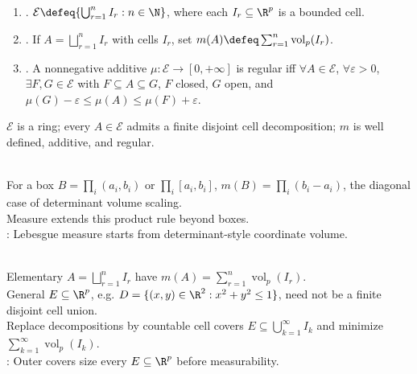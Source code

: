 \begin{definition} \label{def:elementary-sets-and-regular-set-functions} 
\begin{enumerate}[label=(\roman*)]
\setlength{\itemsep}{0pt}
\item {}. $\mathcal{E}\defeq\{\bigcup_{r=1}^{n}I_r:n\in\N\}$, where each $I_r\subseteq\R^p$ is a bounded cell.
\item {}. If $A=\bigsqcup_{r=1}^{n}I_r$ with cells $I_r$, set $m(A)\defeq\sum_{r=1}^{n}\operatorname{vol}_p(I_r)$.
\item {}. A nonnegative additive $\mu:\mathcal{E}\to[0,+\infty]$ is regular iff $\forall A\in\mathcal{E}$, $\forall\varepsilon>0$,\\
$\exists F,G\in\mathcal{E}$ with $F\subseteq A\subseteq G$, $F$ closed, $G$ open, and $\mu(G)-\varepsilon\leq\mu(A)\leq\mu(F)+\varepsilon$.
\end{enumerate}
$\mathcal{E}$ is a ring; every $A\in\mathcal{E}$ admits a finite disjoint cell decomposition; $m$ is well defined, additive, and regular.
\end{definition}

\begin{perspective} \label{per:box-volume-and-linear-algebra} \\
For a box $B=\prod_i(a_i,b_i)$ or $\prod_i[a_i,b_i]$, $m(B)=\prod_i(b_i-a_i)$, the diagonal case of determinant volume scaling.\\
Measure extends this product rule beyond boxes.\\
: Lebesgue measure starts from determinant-style coordinate volume.
\end{perspective}

\begin{perspective} \label{per:outer-measure-overestimation} \\
Elementary $A=\bigsqcup_{r=1}^{n}I_r$ have $m(A)=\sum_{r=1}^{n}\operatorname{vol}_p(I_r)$.\\
General $E\subseteq\R^p$, e.g. $D=\{(x,y)\in\R^2:x^2+y^2\leq1\}$, need not be a finite disjoint cell union.\\
Replace decompositions by countable cell covers $E\subseteq\bigcup_{k=1}^{\infty}I_k$ and minimize $\sum_{k=1}^{\infty}\operatorname{vol}_p(I_k)$.\\
: Outer covers size every $E\subseteq\R^p$ before measurability.
\end{perspective}

